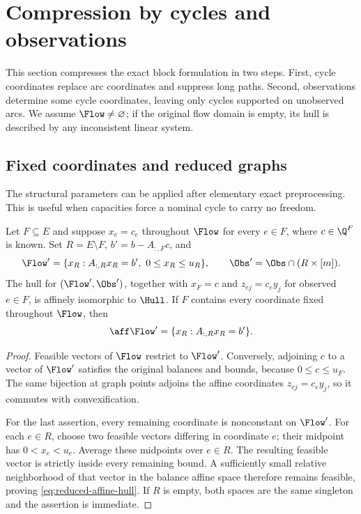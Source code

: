 \section{Compression by cycles and observations}\label{sec:compression}
This section compresses the exact block formulation in two steps. First,
cycle coordinates replace arc coordinates and suppress long paths. Second,
observations determine some cycle coordinates, leaving only cycles supported
on unobserved arcs. We assume $\Flow\ne\varnothing$; if the original flow
domain is empty, its hull is described by any inconsistent linear system.

\subsection{Fixed coordinates and reduced graphs}\label{subsec:fixed-arcs}
The structural parameters can be applied after elementary exact preprocessing.
This is useful when capacities force a nominal cycle to carry no freedom.

\begin{lemma}\label{lem:fixed-arcs}
Let $F\subseteq E$ and suppose $x_e=c_e$ throughout $\Flow$ for every
$e\in F$, where $c\in\Q^F$ is known. Set $R=E\setminus F$,
$b'=b-A_{:,F}c$, and
\[
 \Flow'=\{x_R:A_{:,R}x_R=b',\ 0\le x_R\le u_R\},\qquad
 \Obs'=\Obs\cap(R\times[m]).
\]
The hull for $(\Flow',\Obs')$, together with
$x_F=c$ and $z_{ej}=c_e y_j$ for observed $e\in F$, is affinely
isomorphic to $\Hull$. If $F$ contains every coordinate fixed throughout
$\Flow$, then
\begin{equation}\label{eq:reduced-affine-hull}
 \aff\Flow'=\{x_R:A_{:,R}x_R=b'\}.
\end{equation}
\end{lemma}
\begin{proof}
Feasible vectors of $\Flow$ restrict to $\Flow'$. Conversely, adjoining
$c$ to a vector of $\Flow'$ satisfies the original balances and bounds,
because $0\le c\le u_F$. The same bijection at graph points adjoins the
affine coordinates $z_{ej}=c_e y_j$, so it commutes with convexification.

For the last assertion, every remaining coordinate is nonconstant on
$\Flow'$. For each $e\in R$, choose two feasible vectors differing in
coordinate $e$; their midpoint has $0<x_e<u_e$. Average these midpoints
over $e\in R$. The resulting feasible vector is strictly inside every
remaining bound. A sufficiently small relative neighborhood of that vector
in the balance affine space therefore remains feasible, proving
\eqref{eq:reduced-affine-hull}. If $R$ is empty, both spaces are the same
singleton and the assertion is immediate.
\end{proof}

